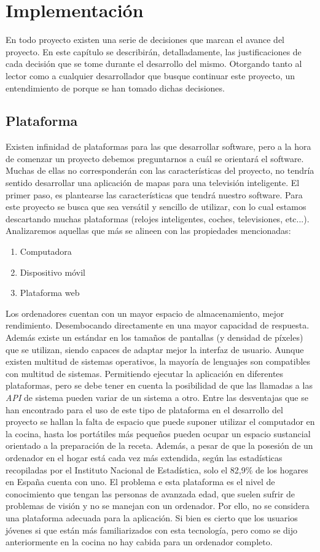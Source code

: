 \chapter{Implementación}
En todo proyecto existen una serie de decisiones que marcan el avance del proyecto. En este capítulo se describirán, detalladamente, las justificaciones de cada decisión que se tome durante el desarrollo del mismo. Otorgando tanto al lector como a cualquier desarrollador que busque continuar este proyecto, un entendimiento de porque se han tomado dichas decisiones.

\section{Plataforma}
Existen infinidad de plataformas para las que desarrollar software, pero a la hora de comenzar un proyecto debemos preguntarnos a cuál se orientará el software. Muchas de ellas no corresponderán con las características del proyecto, no tendría sentido desarrollar una aplicación de mapas para una televisión inteligente. 
El primer paso, es plantearse las características que tendrá nuestro software. Para este proyecto se busca que sea versátil y sencillo de utilizar, con lo cual estamos descartando muchas plataformas (relojes inteligentes, coches, televisiones, etc...). Analizaremos aquellas que más se alineen con las propiedades mencionadas: 
\begin{enumerate}
    \item Computadora
    \item Dispositivo móvil
    \item Plataforma web
\end{enumerate}
Los ordenadores cuentan con un mayor espacio de almacenamiento, mejor rendimiento. Desembocando directamente en una mayor capacidad de respuesta. Además existe un estándar en los tamaños de pantallas (y densidad de píxeles) que se utilizan, siendo capaces de adaptar mejor la interfaz de usuario. Aunque existen multitud de sistemas operativos, la mayoría de lenguajes son compatibles con multitud de sistemas. Permitiendo ejecutar la aplicación en diferentes plataformas, pero se debe tener en cuenta la posibilidad de que las llamadas a las \emph{API} de sistema pueden variar de un sistema a otro. Entre las desventajas que se han encontrado para el uso de este tipo de plataforma en el desarrollo del proyecto se hallan la falta de espacio que puede suponer utilizar el computador en la cocina, hasta los portátiles más pequeños pueden ocupar un espacio sustancial orientado a la preparación de la receta. Además, a pesar de que la posesión de un ordenador en el hogar está cada vez más extendida, según las estadísticas recopiladas por el Instituto Nacional de Estadística, solo el 82,9\% de los hogares en España cuenta con uno. El problema e esta plataforma es el nivel de conocimiento que tengan las personas de avanzada edad, que suelen sufrir de problemas de visión y no se manejan con un ordenador. Por ello, no se considera una plataforma adecuada para la aplicación. Si bien es cierto que los usuarios jóvenes si que están más familiarizados con esta tecnología, pero como se dijo anteriormente en la cocina no hay cabida para un ordenador completo.

